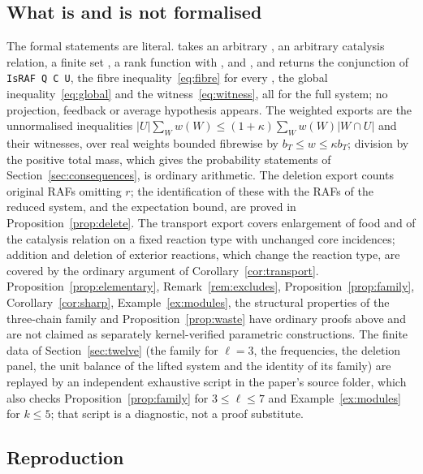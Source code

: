 \documentclass[11pt,a4paper]{article}
\theoremstyle{plain}
\theoremstyle{definition}
\theoremstyle{remark}
\begin{document}
\subsection{What is and is not formalised}

The formal statements are literal.  takes an arbitrary , an arbitrary catalysis relation, a finite set , a rank function with , and , and returns the conjunction of \texttt{IsRAF Q C U}, the fibre inequality~\eqref{eq:fibre} for every , the global inequality~\eqref{eq:global} and the witness~\eqref{eq:witness}, all for the full system; no projection, feedback or average hypothesis appears. The weighted exports are the unnormalised inequalities $|U|\sum_Ww(W)\le(1+\kappa)\sum_Ww(W)|W\cap U|$ and their witnesses, over real weights bounded fibrewise by $b_T\le w\le\kappa b_T$; division by the positive total mass, which gives the probability statements of Section~\ref{sec:consequences}, is ordinary arithmetic. The deletion export counts original RAFs omitting $r$; the identification of these with the RAFs of the reduced system, and the expectation bound, are proved in Proposition~\ref{prop:delete}. The transport export covers enlargement of food and of the catalysis relation on a fixed reaction type with unchanged core incidences; addition and deletion of exterior reactions, which change the reaction type, are covered by the ordinary argument of Corollary~\ref{cor:transport}. Proposition~\ref{prop:elementary}, Remark~\ref{rem:excludes}, Proposition~\ref{prop:family}, Corollary~\ref{cor:sharp}, Example~\ref{ex:modules}, the structural properties of the three-chain family and Proposition~\ref{prop:waste} have ordinary proofs above and are not claimed as separately kernel-verified parametric constructions. The finite data of Section~\ref{sec:twelve} (the family for $\ell=3$, the frequencies, the deletion panel, the unit balance of the lifted system and the identity of its family) are replayed by an independent exhaustive script in the paper's source folder, which also checks Proposition~\ref{prop:family} for $3\le\ell\le7$ and Example~\ref{ex:modules} for $k\le5$; that script is a diagnostic, not a proof substitute.

\subsection{Reproduction}
\end{document}
